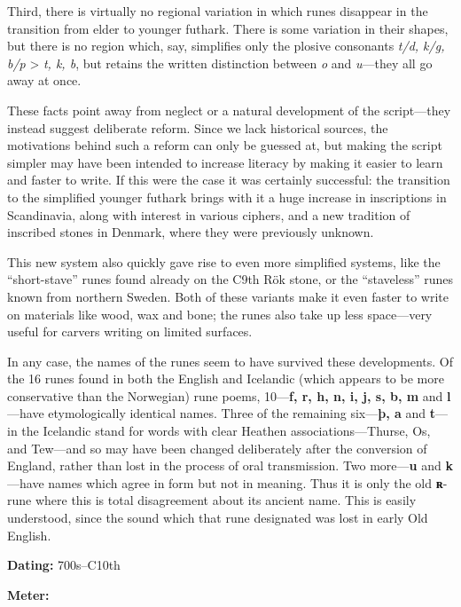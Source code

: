 Third, there is virtually no regional variation in which runes disappear in the transition from elder to younger futhark.  There is some variation in their shapes, but there is no region which, say, simplifies only the plosive consonants \emph{t/d, k/g, b/p} > \emph{t, k, b}, but retains the written distinction between \emph{o} and \emph{u}—they all go away at once.

These facts point away from neglect or a natural development of the script—they instead suggest deliberate reform.  Since we lack historical sources, the motivations behind such a reform can only be guessed at, but making the script simpler may have been intended to increase literacy by making it easier to learn and faster to write.  If this were the case it was certainly successful: the transition to the simplified younger futhark brings with it a huge increase in inscriptions in Scandinavia, along with interest in various ciphers, and a new tradition of inscribed stones in Denmark, where they were previously unknown.

This new system also quickly gave rise to even more simplified systems, like the “short-stave” runes found already on the C9th Rök stone, or the “staveless” runes known from northern Sweden.  Both of these variants make it even faster to write on materials like wood, wax and bone; the runes also take up less space—very useful for carvers writing on limited surfaces.

In any case, the names of the runes seem to have survived these developments.  Of the 16 runes found in both the English and Icelandic (which appears to be more conservative than the Norwegian) rune poems, 10—\textbf{f, r, h, n, i, j, s, b, m} and \textbf{l}—have etymologically identical names.  Three of the remaining six—\textbf{þ, a} and \textbf{t}—in the Icelandic stand for words with clear Heathen associations—Thurse, Os, and Tew—and so may have been changed deliberately after the conversion of England, rather than lost in the process of oral transmission.  Two more—\textbf{u} and \textbf{k}—have names which agree in form but not in meaning.  Thus it is only the old \textbf{ʀ}-rune where this is total disagreement about its ancient name.  This is easily understood, since the sound which that rune designated was lost in early Old English.


\begin{flushright}%
\textbf{Dating:} 700s–C10th%

\textbf{Meter:} \Fornyrdislag%
\end{flushright}%

